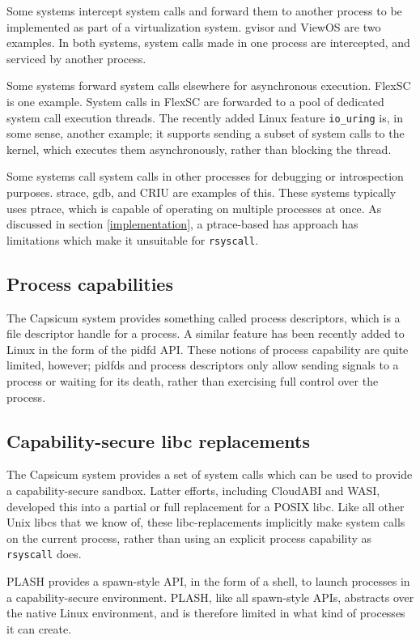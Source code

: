 \documentclass[letterpaper,twocolumn,10pt]{article}
\begin{document}
Some systems intercept system calls and forward them to another process to be implemented
as part of a virtualization system.
gvisor\cite{gvisor} and ViewOS\cite{viewos} are two examples.
In both systems,
system calls made in one process are intercepted,
and serviced by another process.

Some systems forward system calls elsewhere for asynchronous execution.
FlexSC\cite{flexsc} is one example.
System calls in FlexSC are forwarded to a pool of dedicated system call execution threads.
The recently added Linux feature \verb|io_uring| is, in some sense, another example;
it supports sending a subset of system calls to the kernel,
which executes them asynchronously,
rather than blocking the thread.

Some systems call system calls in other processes for debugging or introspection purposes.
strace, gdb, and CRIU\cite{criu} are examples of this.
These systems typically uses ptrace,
which is capable of operating on multiple processes at once.
As discussed in section \ref{implementation},
a ptrace-based has approach has limitations which make it unsuitable for \texttt{rsyscall}.
\subsection{Process capabilities}
The Capsicum system provides something called process descriptors\cite{capsicum},
which is a file descriptor handle for a process.
A similar feature has been recently added to Linux in the form of the pidfd API\cite{pidfd}.
These notions of process capability are quite limited, however;
pidfds and process descriptors only allow sending signals to a process or waiting for its death,
rather than exercising full control over the process.
\subsection{Capability-secure libc replacements}
The Capsicum system provides a set of system calls
which can be used to provide a capability-secure sandbox.\cite{capsicum}
Latter efforts\cite{oblivious}, including CloudABI\cite{cloudabi} and WASI\cite{wasi},
developed this into a partial or full replacement for a POSIX libc.
Like all other Unix libcs that we know of,
these libc-replacements implicitly make system calls on the current process,
rather than using an explicit process capability as \texttt{rsyscall} does.

PLASH provides a spawn-style API, in the form of a shell,
to launch processes in a capability-secure environment.\cite{plash}
PLASH, like all spawn-style APIs, abstracts over the native Linux environment,
and is therefore limited in what kind of processes it can create.
\end{document}
